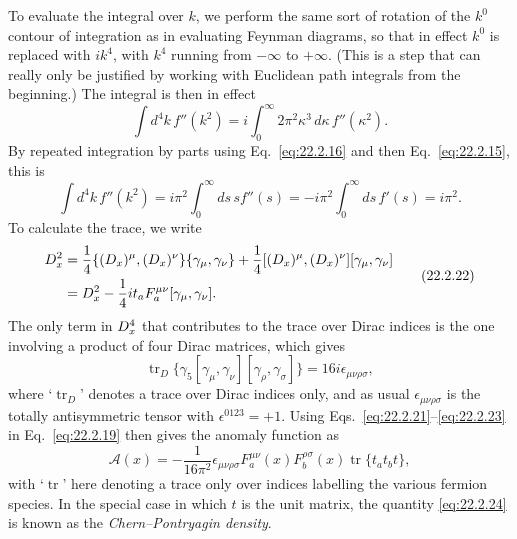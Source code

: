 To evaluate the integral over $k$, we perform the same sort of rotation of
the $k^0$ contour of integration as in evaluating Feynman diagrams, so that
in effect $k^0$ is replaced with $ik^4$, with $k^4$ running from $-\infty$
to $+\infty$. (This is a step that can really only be justified by working
with Euclidean path integrals from the beginning.) The integral is then in
effect
\begin{equation}
 \int d^4k\,f''(k^2)
 =i\int_0^\infty 2\pi^2\kappa^3\,d\kappa\,f''(\kappa^2).
 \tag{22.2.20}\label{eq:22.2.20}
\end{equation}
By repeated integration by parts using Eq.~\eqref{eq:22.2.16} and then
Eq.~\eqref{eq:22.2.15}, this is
\begin{equation}
 \int d^4k\,f''(k^2)
 =i\pi^2\int_0^\infty ds\,s f''(s)
 =-i\pi^2\int_0^\infty ds\,f'(s)
 =i\pi^2.
 \tag{22.2.21}\label{eq:22.2.21}
\end{equation}
To calculate the trace, we write
\begin{equation}
 \begin{aligned}
 \sl{D}_x^2
 &=\frac14\{(D_x)^\mu,(D_x)^\nu\}\{\gamma_\mu,\gamma_\nu\}
 +\frac14[(D_x)^\mu,(D_x)^\nu][\gamma_\mu,\gamma_\nu]\\
 &=D_x^2-\frac14it_a F_a^{\mu\nu}
 [\gamma_\mu,\gamma_\nu].
 \end{aligned}
 \tag{22.2.22}\label{eq:22.2.22}
\end{equation}
The only term in $\sl{D}_x^4$ that contributes to the trace over Dirac
indices is the one involving a product of four Dirac matrices, which gives
\begin{equation}
 \operatorname{tr}_{D}\{\gamma_5
 [\gamma_\mu,\gamma_\nu][\gamma_\rho,\gamma_\sigma]\}
 =16i\epsilon_{\mu\nu\rho\sigma},
 \tag{22.2.23}\label{eq:22.2.23}
\end{equation}
where `$\operatorname{tr}_{D}$' denotes a trace over Dirac indices only,
and as usual $\epsilon_{\mu\nu\rho\sigma}$ is the totally antisymmetric
tensor with $\epsilon^{0123}=+1$. Using
Eqs.~\eqref{eq:22.2.21}--\eqref{eq:22.2.23} in Eq.~\eqref{eq:22.2.19}
then gives the anomaly function as
\begin{equation}
 \mathcal A(x)=-\frac{1}{16\pi^2}\epsilon_{\mu\nu\rho\sigma}
 F_a^{\mu\nu}(x)F_b^{\rho\sigma}(x)
 \operatorname{tr}\{t_a t_b t\},
 \tag{22.2.24}\label{eq:22.2.24}
\end{equation}
with `$\operatorname{tr}$' here denoting a trace only over indices
labelling the various fermion species. In the special case in which $t$ is
the unit matrix, the quantity \eqref{eq:22.2.24} is known as the
\emph{Chern--Pontryagin density}.

